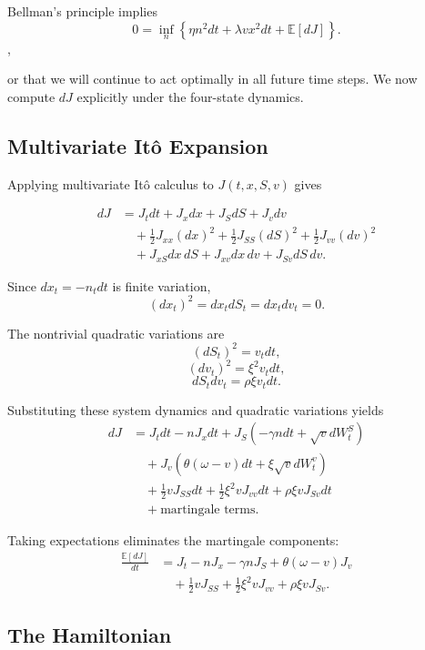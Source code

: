 \documentclass[11pt]{article}
\begin{document}
Bellman's principle \cite{fleming2006controlled} implies
\[
0
=
\inf_n
\left\{
\eta n^2dt
+
\lambda v x^2dt
+
\mathbb E[dJ]
\right\}.
\],

or that we will continue to act optimally in all future time steps. We now compute $dJ$ explicitly under the four-state dynamics.

\subsection{Multivariate It\^o Expansion}

Applying multivariate It\^o calculus to $J(t,x,S,v)$ gives \cite{karatzas1998brownian}

\begin{align*}
dJ
&=
J_tdt
+
J_xdx
+
J_SdS
+
J_vdv
\\
&\quad
+
\frac12J_{xx}(dx)^2
+
\frac12J_{SS}(dS)^2
+
\frac12J_{vv}(dv)^2
\\
&\quad
+
J_{xS}dx\,dS
+
J_{xv}dx\,dv
+
J_{Sv}dS\,dv.
\end{align*}

Since $dx_t=-n_tdt$ is finite variation,
\[
(dx_t)^2 = dx_t dS_t = dx_t dv_t = 0.
\]

The nontrivial quadratic variations are
\[
(dS_t)^2 = v_tdt,
\]
\[
(dv_t)^2 = \xi^2v_tdt,
\]
\[
dS_tdv_t
=
\rho\xi v_tdt.
\]

Substituting these system dynamics and quadratic variations yields
\begin{align*}
dJ
&=
J_tdt
-
nJ_xdt
+
J_S\left(-\gamma n dt + \sqrt v dW_t^S\right)
\\
&\quad
+
J_v\left(\theta(\omega-v)dt + \xi\sqrt v dW_t^v\right)
\\
&\quad
+
\frac12vJ_{SS}dt
+
\frac12\xi^2vJ_{vv}dt
+
\rho\xi vJ_{Sv}dt
\\
&\quad
+
\text{martingale terms}.
\end{align*}

Taking expectations eliminates the martingale components:
\begin{align*}
\frac{\mathbb E[dJ]}{dt}
&=
J_t
-
nJ_x
-
\gamma nJ_S
+
\theta(\omega-v)J_v
\\
&\quad
+
\frac12vJ_{SS}
+
\frac12\xi^2vJ_{vv}
+
\rho\xi vJ_{Sv}.
\end{align*}

\subsection{The Hamiltonian}
\end{document}
